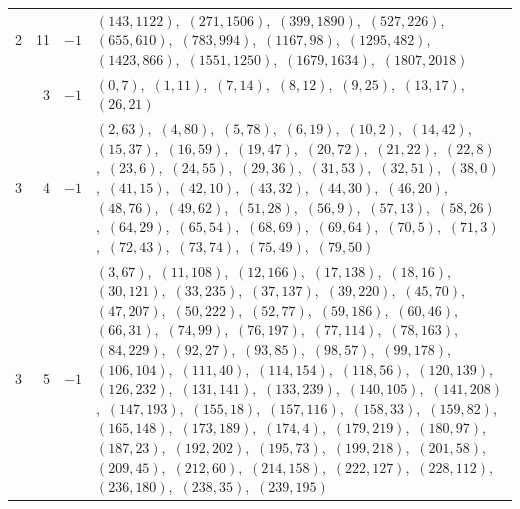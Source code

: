 \documentclass[11pt]{article}
\begin{document}
\begin{longtable}{@{}rrl>{\raggedright\arraybackslash}p{}@{}}
2 & 11 & $-1$ & $(143,1122)$,\allowbreak\ $(271,1506)$,\allowbreak\ $(399,1890)$,\allowbreak\ $(527,226)$,\allowbreak\ $(655,610)$,\allowbreak\ $(783,994)$,\allowbreak\ $(1167,98)$,\allowbreak\ $(1295,482)$,\allowbreak\ $(1423,866)$,\allowbreak\ $(1551,1250)$,\allowbreak\ $(1679,1634)$,\allowbreak\ $(1807,2018)$\\
\addlinespace[3pt]
3 & 3 & $-1$ & $(0,7)$,\allowbreak\ $(1,11)$,\allowbreak\ $(7,14)$,\allowbreak\ $(8,12)$,\allowbreak\ $(9,25)$,\allowbreak\ $(13,17)$,\allowbreak\ $(26,21)$\\
3 & 4 & $-1$ & $(2,63)$,\allowbreak\ $(4,80)$,\allowbreak\ $(5,78)$,\allowbreak\ $(6,19)$,\allowbreak\ $(10,2)$,\allowbreak\ $(14,42)$,\allowbreak\ $(15,37)$,\allowbreak\ $(16,59)$,\allowbreak\ $(19,47)$,\allowbreak\ $(20,72)$,\allowbreak\ $(21,22)$,\allowbreak\ $(22,8)$,\allowbreak\ $(23,6)$,\allowbreak\ $(24,55)$,\allowbreak\ $(29,36)$,\allowbreak\ $(31,53)$,\allowbreak\ $(32,51)$,\allowbreak\ $(38,0)$,\allowbreak\ $(41,15)$,\allowbreak\ $(42,10)$,\allowbreak\ $(43,32)$,\allowbreak\ $(44,30)$,\allowbreak\ $(46,20)$,\allowbreak\ $(48,76)$,\allowbreak\ $(49,62)$,\allowbreak\ $(51,28)$,\allowbreak\ $(56,9)$,\allowbreak\ $(57,13)$,\allowbreak\ $(58,26)$,\allowbreak\ $(64,29)$,\allowbreak\ $(65,54)$,\allowbreak\ $(68,69)$,\allowbreak\ $(69,64)$,\allowbreak\ $(70,5)$,\allowbreak\ $(71,3)$,\allowbreak\ $(72,43)$,\allowbreak\ $(73,74)$,\allowbreak\ $(75,49)$,\allowbreak\ $(79,50)$\\
3 & 5 & $-1$ & $(3,67)$,\allowbreak\ $(11,108)$,\allowbreak\ $(12,166)$,\allowbreak\ $(17,138)$,\allowbreak\ $(18,16)$,\allowbreak\ $(30,121)$,\allowbreak\ $(33,235)$,\allowbreak\ $(37,137)$,\allowbreak\ $(39,220)$,\allowbreak\ $(45,70)$,\allowbreak\ $(47,207)$,\allowbreak\ $(50,222)$,\allowbreak\ $(52,77)$,\allowbreak\ $(59,186)$,\allowbreak\ $(60,46)$,\allowbreak\ $(66,31)$,\allowbreak\ $(74,99)$,\allowbreak\ $(76,197)$,\allowbreak\ $(77,114)$,\allowbreak\ $(78,163)$,\allowbreak\ $(84,229)$,\allowbreak\ $(92,27)$,\allowbreak\ $(93,85)$,\allowbreak\ $(98,57)$,\allowbreak\ $(99,178)$,\allowbreak\ $(106,104)$,\allowbreak\ $(111,40)$,\allowbreak\ $(114,154)$,\allowbreak\ $(118,56)$,\allowbreak\ $(120,139)$,\allowbreak\ $(126,232)$,\allowbreak\ $(131,141)$,\allowbreak\ $(133,239)$,\allowbreak\ $(140,105)$,\allowbreak\ $(141,208)$,\allowbreak\ $(147,193)$,\allowbreak\ $(155,18)$,\allowbreak\ $(157,116)$,\allowbreak\ $(158,33)$,\allowbreak\ $(159,82)$,\allowbreak\ $(165,148)$,\allowbreak\ $(173,189)$,\allowbreak\ $(174,4)$,\allowbreak\ $(179,219)$,\allowbreak\ $(180,97)$,\allowbreak\ $(187,23)$,\allowbreak\ $(192,202)$,\allowbreak\ $(195,73)$,\allowbreak\ $(199,218)$,\allowbreak\ $(201,58)$,\allowbreak\ $(209,45)$,\allowbreak\ $(212,60)$,\allowbreak\ $(214,158)$,\allowbreak\ $(222,127)$,\allowbreak\ $(228,112)$,\allowbreak\ $(236,180)$,\allowbreak\ $(238,35)$,\allowbreak\ $(239,195)$\\

\end{longtable}
\end{document}
